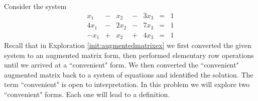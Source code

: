 \documentclass{ximera}
\begin{document}
\begin{exploration}\label{init:backsub}
Consider the system
$$\begin{array}{ccccccc}
      x_1 &- &x_2&-&3x_3&= &1 \\
   4x_1& -&2x_2&-&7x_3&=&1\\
   -x_1& +&x_2&+&4x_3&=&1
    \end{array}$$
Recall that in Exploration \ref{init:augmentedmatrixex} we first converted the given system to an augmented matrix form, then performed elementary row operations until we arrived at a ``convenient" form.  We then converted the ``convenient" augmented matrix back to a system of equations and identified the solution.  The term ``convenient" is open to interpretation.  In this problem we will explore two ``convenient" forms.  Each one will lead to a definition.  


\end{exploration}
\end{document}

